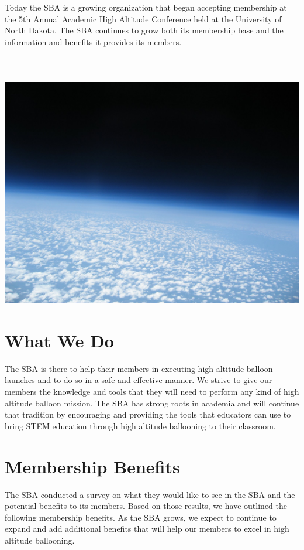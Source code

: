 \documentclass[10pt,foldmark,notumble]{leaflet}
\begin{document}
Today the SBA is a growing organization that began accepting membership at the 5th Annual Academic High Altitude Conference held at the University of North Dakota. The SBA continues to grow both its membership base and the information and benefits it provides its members. 
\ \\ \ \\ \ \\ \ \\
\includegraphics[scale=.2]{images/IMG_1921.jpg}

\section{What We Do}

The SBA is there to help their members in executing high altitude balloon launches and to do so in a safe and effective manner.  We strive to give our members the knowledge and tools that they will need to perform any kind of high altitude balloon mission.  The SBA has strong roots in academia and will continue that tradition by encouraging and providing the tools that educators can use to bring STEM education through high altitude ballooning to their classroom.

\section{Membership Benefits}
The SBA conducted a survey on what they would like to see in the SBA and the potential benefits to its members.  Based on those results, we have outlined the following membership benefits.  As the SBA grows, we expect to continue to expand and add additional benefits that will help our members to excel in high altitude ballooning.
\end{document}
